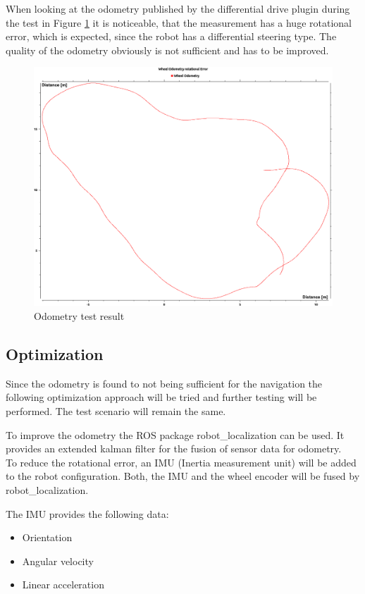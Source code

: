 When looking at the odometry published by the differential drive plugin during the test in Figure \ref{wheel odom} it is noticeable, that the measurement has a huge rotational error, which is expected, since the robot has a differential steering type.
The quality of the odometry obviously is not sufficient and has to be improved.
\begin{figure} 
	\includegraphics[width=\textwidth]{Pictures/rot error}
	\caption{Odometry test result}
	\label{wheel odom}

\end{figure}


\subsection{Optimization}
Since the odometry is found to not being sufficient for the navigation the following optimization approach will be tried and further testing will be performed. The test scenario will remain the same.

To improve the odometry the ROS package robot\_localization can be used. It provides an extended kalman filter for the fusion of sensor data for odometry.\\

To reduce the rotational error, an IMU (Inertia measurement unit) will be added to the robot configuration. Both, the IMU and the wheel encoder will be fused by robot\_localization.

The IMU provides the following data:
\begin{itemize}
	\item Orientation
	\item Angular velocity
	\item Linear acceleration
\end{itemize}

